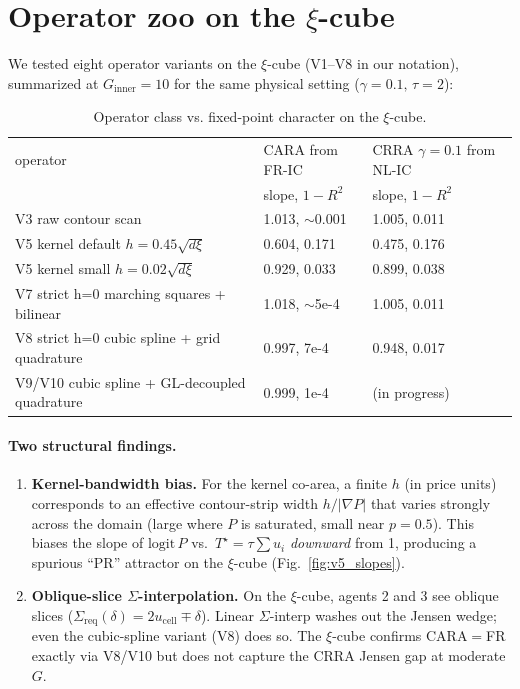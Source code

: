 \documentclass[11pt]{article}
\begin{document}
\section{Operator zoo on the $\xi$-cube}\label{sec:zoo}

We tested eight operator variants on the $\xi$-cube (V1--V8 in our notation), summarized at
$G_\mathrm{inner}{=}10$ for the same physical setting ($\gamma{=}0.1,\,\tau{=}2$):

\begin{table}[H]
\centering
\begin{tabular}{lll}
\toprule
operator & CARA from FR-IC & CRRA $\gamma{=}0.1$ from NL-IC \\
& slope, $1{-}R^2$ & slope, $1{-}R^2$ \\
\midrule
V3 raw contour scan & 1.013, $\sim$0.001 & 1.005, 0.011 \\
V5 kernel default $h{=}0.45\sqrt{d\xi}$ & 0.604, 0.171 & 0.475, 0.176 \\
V5 kernel small $h{=}0.02\sqrt{d\xi}$ & 0.929, 0.033 & 0.899, 0.038 \\
V7 strict h=0 marching squares + bilinear & 1.018, $\sim$5e-4 & 1.005, 0.011 \\
V8 strict h=0 cubic spline + grid quadrature & 0.997, 7e-4 & 0.948, 0.017 \\
V9/V10 cubic spline + GL-decoupled quadrature & 0.999, 1e-4 & (in progress) \\
\bottomrule
\end{tabular}
\caption{\label{tab:zoo}Operator class vs. fixed-point character on the $\xi$-cube.}
\end{table}

\paragraph{Two structural findings.}
\begin{enumerate}
\item \textbf{Kernel-bandwidth bias.} For the kernel co-area, a finite $h$ (in price units)
corresponds to an effective contour-strip width $h/|\nabla P|$ that varies strongly across the
domain (large where $P$ is saturated, small near $p{=}0.5$). This biases the slope of
$\mathrm{logit}\,P$ vs.\ $T^\star=\tau\sum u_i$ \emph{downward} from 1, producing a spurious
``PR'' attractor on the $\xi$-cube (Fig.~\ref{fig:v5_slopes}).
\item \textbf{Oblique-slice $\Sigma$-interpolation.} On the $\xi$-cube, agents 2 and 3 see
oblique slices ($\Sigma_{\mathrm{req}}(\delta)=2u_{\mathrm{cell}}\mp\delta$). Linear $\Sigma$-interp
washes out the Jensen wedge; even the cubic-spline variant (V8) does so. The $\xi$-cube confirms
CARA$=$FR exactly via V8/V10 but does not capture the CRRA Jensen gap at moderate $G$.
\end{enumerate}
\end{document}
